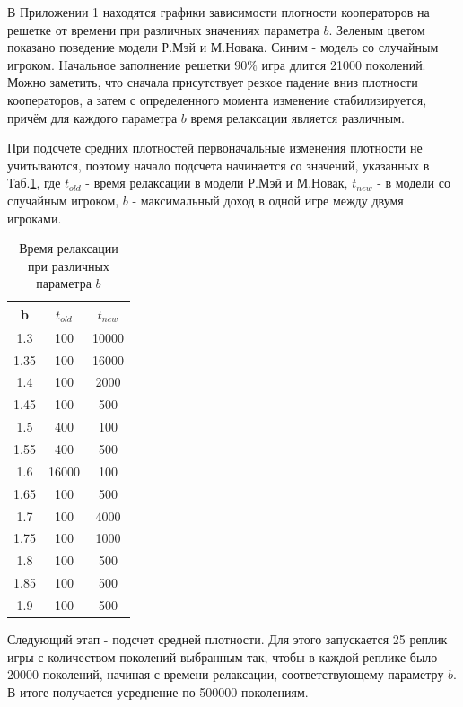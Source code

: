 \documentclass[a4paper]{article}
\begin{document}
		
	В Приложении 1 находятся графики зависимости плотности кооператоров на решетке 
	от времени при различных значениях параметра $b$. Зеленым цветом показано поведение
	модели Р.Мэй и М.Новака. Синим - модель со случайным игроком. Начальное заполнение решетки 90$\%$ игра длится 21000 поколений. Можно заметить, что сначала присутствует резкое падение вниз плотности кооператоров, а затем с определенного момента изменение 
	стабилизируется, причём для каждого параметра $b$ время релаксации является различным.
	
	\par При подсчете средних плотностей первоначальные изменения плотности не учитываются, поэтому начало подсчета начинается со значений, указанных в Таб.\ref{slice_tab}, где $t_{old}$ - время релаксации в модели Р.Мэй и М.Новак,  $t_{new}$ - в модели со случайным игроком,
	$b$ - максимальный доход в одной игре между двумя игроками.
	
	
	\vspace{10px}
	\begin{center}
	\begin{table}[H]
	\centering
		\begin{tabular}[H]{|c|c|c|}
			\hline 
			b&$t_{old}$& $t_{new} $ \\
			\hline 
			1.3& 100 & 10000 \\ 
			\hline 
			1.35& 100 & 16000 \\ 
			\hline 
			1.4& 100 & 2000 \\ 
			\hline 
			1.45& 100 & 500 \\ 
			\hline 
			1.5& 400 & 100 \\ 
			\hline 
			1.55& 400 & 500 \\ 
			\hline 
			1.6& 16000 & 100 \\ 
			\hline 
			1.65& 100 & 500 \\ 
			\hline 
			1.7& 100 & 4000 \\ 
			\hline 
			1.75& 100 & 1000 \\ 
			\hline 
			1.8& 100 & 500 \\ 
			\hline 
			1.85& 100 & 500 \\ 
			\hline 
			1.9& 100 & 500 \\ 
			\hline 
		\end{tabular}
		\caption{Время релаксации при различных параметра $b$}
		\label{slice_tab}
	\end{table}
	\end{center}	

	\par Следующий этап - подсчет средней плотности. Для этого запускается 25 реплик игры с количеством поколений выбранным так, чтобы в каждой реплике было 20000 поколений, начиная с времени релаксации, соответствующему параметру $b$. В итоге получается усреднение по 500000 поколениям. 
	
\end{document}
